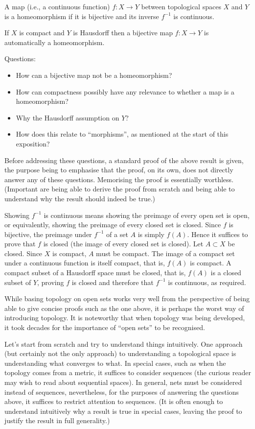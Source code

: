 \documentclass[a4paper,11pt]{article}
\begin{document}
A map (i.e., a continuous function) $f \colon X \rightarrow Y$ between
topological spaces $X$ and $Y$ is a homeomorphism if it is bijective
and its inverse $f^{-1}$ is continuous.

If $X$ is compact and $Y$ is Hausdorff then a bijective map $f \colon
X \rightarrow Y$ is automatically a homeomorphism.

Questions:
\begin{itemize}
\item How can a bijective map not be a homeomorphism?
\item How can compactness possibly have any relevance to whether a map
  is a homeomorphism?
\item Why the Hausdorff assumption on $Y$?
\item How does this relate to ``morphisms'', as mentioned at the start
  of this exposition?
\end{itemize}

Before addressing these questions, a standard proof of the above
result is given, the purpose being to emphasise that the proof, on its
own, does not directly answer any of these questions. Memorising the
proof is essentially worthless. (Important are being able to derive
the proof from scratch and being able to understand why the result
should indeed be true.)

Showing $f^{-1}$ is continuous means showing the preimage of every
open set is open, or equivalently, showing the preimage of every
closed set is closed. Since $f$ is bijective, the preimage under
$f^{-1}$ of a set $A$ is simply $f(A)$. Hence it suffices to prove
that $f$ is closed (the image of every closed set is closed). Let $A
\subset X$ be closed. Since $X$ is compact, $A$ must be compact. The
image of a compact set under a continuous function is itself compact,
that is, $f(A)$ is compact. A compact subset of a Hausdorff space must
be closed, that is, $f(A)$ is a closed subset of $Y$, proving $f$ is
closed and therefore that $f^{-1}$ is continuous, as required.

While basing topology on open sets works very well from the
perspective of being able to give concise proofs such as the one
above, it is perhaps the worst way of introducing topology. It is
noteworthy that when topology was being developed, it took decades for
the importance of ``open sets'' to be recognised.

Let's start from scratch and try to understand things intuitively. One
approach (but certainly not the only approach) to understanding a
topological space is understanding what converges to what. In special
cases, such as when the topology comes from a metric, it suffices to
consider sequences (the curious reader may wish to read about
sequential spaces). In general, nets must be considered instead of
sequences, nevertheless, for the purposes of answering the questions
above, it suffices to restrict attention to sequences. (It is often
enough to understand intuitively why a result is true in special
cases, leaving the proof to justify the result in full generality.)
\end{document}
